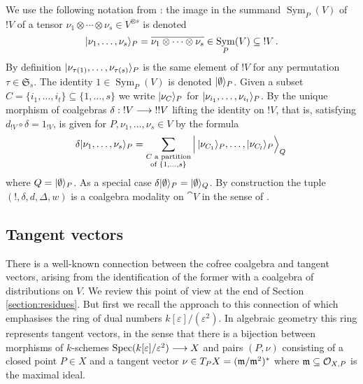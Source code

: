 \documentclass[english,letter paper,12pt,reqno]{article}
\DeclarePairedDelimiter\ket{\lvert}{\rangle}
\theoremstyle{example}
\def\be{\begin{equation}}
\def\ee{\end{equation}}
\DeclareMathOperator{\Spec}{Spec}
\DeclareMathOperator{\Sym}{Sym}
\begin{document}
We use the following notation from \cite{murfet_coalg,murfet_ll}: the image in the summand $\Sym_P(V)$ of ${!} V$ of a tensor $\nu_1 \otimes \cdots \otimes \nu_s \in V^{\otimes s}$ is denoted
\[
\ket{\nu_1,\ldots,\nu_s}_P = \overline{\nu_1 \otimes \cdots \otimes \nu_s} \in \Sym_P(V) \subseteq {!} V\,.
\]
By definition $\ket{\nu_{\tau(1)}, \ldots, \nu_{\tau(s)}}_P$ is the same element of ${!} V$ for any permutation $\tau \in \mathfrak{S}_s$. The identity $1 \in \Sym_P(V)$ is denoted $\ket{\emptyset}_P$. Given a subset $C = \{i_1,\ldots,i_t\} \subseteq \{1,\ldots,s\}$ we write $\ket{\nu_C}_P$ for $\ket{\nu_{i_1},\ldots,\nu_{i_t}}_P$. By \cite[Theorem 2.22]{murfet_coalg} the unique morphism of coalgebras $\delta: {!} V \longrightarrow {!} {!} V$ lifting the identity on ${!} V$, that is, satisfying $d_{{!} V} \circ \delta = 1_{{!} V}$, is given for $P, \nu_1,\ldots,\nu_s \in V$ by the formula
\be
\delta \ket{\nu_1, \ldots, \nu_s}_P = \sum_{\substack{C \text{ a partition}\\ \text{of } \{1,\ldots,s\}}} \Big|\, \ket{\nu_{C_1}}_P, \ldots, \ket{\nu_{C_l}}_P \Big\rangle_Q\,
\ee
where $Q = \ket{\emptyset}_P$. As a special case $\delta\ket{\emptyset}_P = \ket{\emptyset}_Q$. By construction the tuple $({!}, \delta, d, \Delta, w)$ is a coalgebra modality on $\cat{V}$ in the sense of \cite[Definition 2.1]{blutecs}.

\subsection{Tangent vectors}\label{section:tangent_vectors}

There is a well-known connection between the cofree coalgebra and tangent vectors, arising from the identification of the former with a coalgebra of distributions on $V$. We review this point of view at the end of Section \ref{section:residues}. But first we recall the approach to this connection of \cite[Appendix B]{murfet_ll} which emphasises the ring of dual numbers $k[\varepsilon]/(\varepsilon^2)$. In algebraic geometry this ring represents tangent vectors, in the sense that there is a bijection between morphisms of $k$-schemes $\Spec(k[\varepsilon]/\varepsilon^2) \lto X$ and pairs $(P, \nu)$ consisting of a closed point $P \in X$ and a tangent vector $\nu \in T_P X = (\mathfrak{m}/\mathfrak{m}^2)^*$ where $\mathfrak{m} \subseteq \mathcal{O}_{X,P}$ is the maximal ideal.
\end{document}
